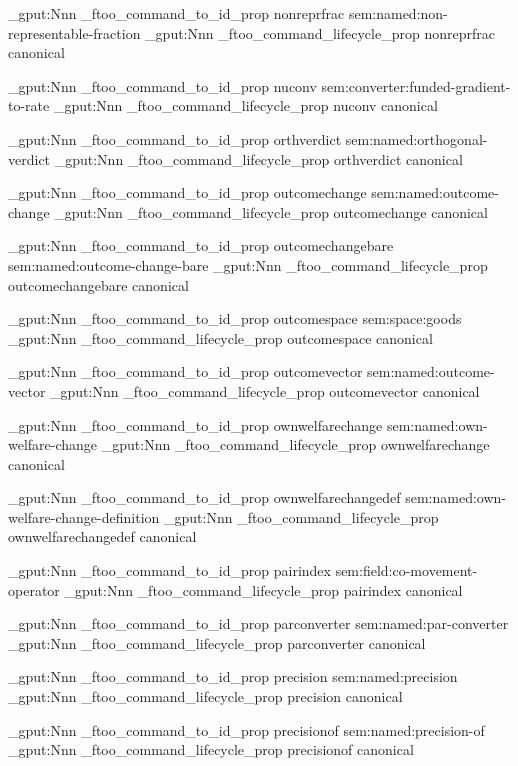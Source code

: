 \prop_gput:Nnn \g_ftoo_command_to_id_prop { nonreprfrac } { sem:named:non-representable-fraction }
\prop_gput:Nnn \g_ftoo_command_lifecycle_prop { nonreprfrac } { canonical }


\prop_gput:Nnn \g_ftoo_command_to_id_prop { nuconv } { sem:converter:funded-gradient-to-rate }
\prop_gput:Nnn \g_ftoo_command_lifecycle_prop { nuconv } { canonical }


\prop_gput:Nnn \g_ftoo_command_to_id_prop { orthverdict } { sem:named:orthogonal-verdict }
\prop_gput:Nnn \g_ftoo_command_lifecycle_prop { orthverdict } { canonical }


\prop_gput:Nnn \g_ftoo_command_to_id_prop { outcomechange } { sem:named:outcome-change }
\prop_gput:Nnn \g_ftoo_command_lifecycle_prop { outcomechange } { canonical }


\prop_gput:Nnn \g_ftoo_command_to_id_prop { outcomechangebare } { sem:named:outcome-change-bare }
\prop_gput:Nnn \g_ftoo_command_lifecycle_prop { outcomechangebare } { canonical }


\prop_gput:Nnn \g_ftoo_command_to_id_prop { outcomespace } { sem:space:goods }
\prop_gput:Nnn \g_ftoo_command_lifecycle_prop { outcomespace } { canonical }


\prop_gput:Nnn \g_ftoo_command_to_id_prop { outcomevector } { sem:named:outcome-vector }
\prop_gput:Nnn \g_ftoo_command_lifecycle_prop { outcomevector } { canonical }


\prop_gput:Nnn \g_ftoo_command_to_id_prop { ownwelfarechange } { sem:named:own-welfare-change }
\prop_gput:Nnn \g_ftoo_command_lifecycle_prop { ownwelfarechange } { canonical }


\prop_gput:Nnn \g_ftoo_command_to_id_prop { ownwelfarechangedef } { sem:named:own-welfare-change-definition }
\prop_gput:Nnn \g_ftoo_command_lifecycle_prop { ownwelfarechangedef } { canonical }


\prop_gput:Nnn \g_ftoo_command_to_id_prop { pairindex } { sem:field:co-movement-operator }
\prop_gput:Nnn \g_ftoo_command_lifecycle_prop { pairindex } { canonical }


\prop_gput:Nnn \g_ftoo_command_to_id_prop { parconverter } { sem:named:par-converter }
\prop_gput:Nnn \g_ftoo_command_lifecycle_prop { parconverter } { canonical }


\prop_gput:Nnn \g_ftoo_command_to_id_prop { precision } { sem:named:precision }
\prop_gput:Nnn \g_ftoo_command_lifecycle_prop { precision } { canonical }


\prop_gput:Nnn \g_ftoo_command_to_id_prop { precisionof } { sem:named:precision-of }
\prop_gput:Nnn \g_ftoo_command_lifecycle_prop { precisionof } { canonical }


